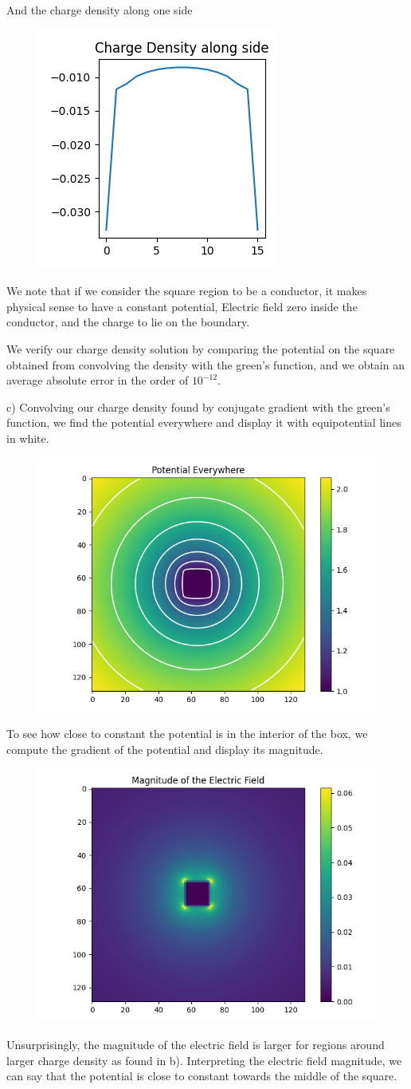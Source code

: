 \documentclass[]{article}
\begin{document}
And the charge density along one side

\begin{figure}[h!]
	\centering
	\includegraphics[width=0.25\linewidth]{../Results/2b2.png}
\end{figure}

We note that if we consider the square region to be a conductor, it makes physical sense to have a constant potential, Electric field zero inside the conductor, and the charge to lie on the boundary.

We verify our charge density solution by comparing the potential on the square obtained from convolving the density with the green's function, and we obtain an average absolute error in the order of $10^{-12}$.

\newpage

c)
Convolving our charge density found by conjugate gradient with the green's function, we find the potential everywhere and display it with equipotential lines in white.

\begin{figure}[h!]
	\centering
	\includegraphics[width=0.5\linewidth]{../Results/2c1.png}
\end{figure}

To see how close to constant the potential is in the interior of the box, we compute the gradient of the potential and display its magnitude. 

\begin{figure}[h!]
	\centering
	\includegraphics[width=0.45\linewidth]{../Results/2c2.png}
\end{figure}
Unsurprisingly, the magnitude of the electric field is larger for regions around larger charge density as found in b). Interpreting the electric field magnitude, we can say that the potential is close to constant towards the middle of the square.
\end{document}
